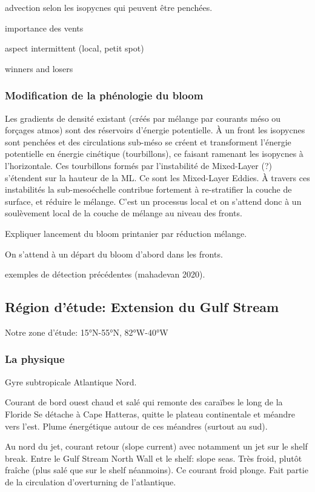 advection selon les isopycnes qui peuvent être penchées.

importance des vents

aspect intermittent (local, petit spot)

winners and losers


\subsubsection{Modification de la phénologie du bloom}
\label{sec:modif-phenologie}

Les gradients de densité existant (créés par mélange par courants méso ou forçages atmos) sont des réservoirs d'énergie potentielle. À un front les isopycnes sont penchées et des circulations sub-méso se créent et transforment l'énergie potentielle en énergie cinétique (tourbillons), ce faisant ramenant les isopycnes à l'horizontale.
Ces tourbillons formés par l'instabilité de Mixed-Layer (?) s'étendent sur la hauteur de la ML. Ce sont les Mixed-Layer Eddies.
À travers ces instabilités la sub-mesoéchelle contribue fortement à re-stratifier la couche  de surface, et réduire le mélange.
C'est un processus local et on s'attend donc à un soulèvement local de la couche de mélange au niveau des fronts.


Expliquer lancement du bloom printanier par réduction mélange.

On s'attend à un départ du bloom d'abord dans les fronts.

exemples de détection précédentes (mahadevan 2020).


\subsection{Région d'étude: Extension du Gulf Stream}
\label{sec:region-detude}

Notre zone d'étude: 15°N-55°N, 82°W-40°W

\subsubsection{La physique}
\label{sec:gs-physique}

Gyre subtropicale Atlantique Nord.

Courant de bord ouest chaud et salé qui remonte des caraïbes le long de la Floride
Se détache à Cape Hatteras, quitte le plateau continentale et méandre vers l'est.
Plume énergétique autour de ces méandres (surtout au sud).

Au nord du jet, courant retour (slope current) avec notamment un jet sur le shelf break.
Entre le Gulf Stream North Wall et le shelf: slope seas. Très froid, plutôt fraîche (plus salé que sur le shelf néanmoins).
Ce courant froid plonge. Fait partie de la circulation d'overturning de l'atlantique.

